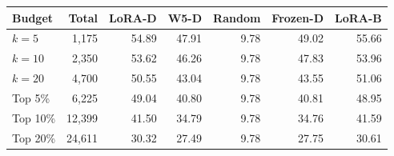 {\footnotesize\setlength{\tabcolsep}{4pt}
\begin{tabularx}{\textwidth}{Xrrrrrr}
\toprule
Budget & Total & LoRA-D & W5-D & Random & Frozen-D & LoRA-B \\
\midrule
$k=5$ & 1,175 & 54.89 & 47.91 & 9.78 & 49.02 & 55.66 \\
$k=10$ & 2,350 & 53.62 & 46.26 & 9.78 & 47.83 & 53.96 \\
$k=20$ & 4,700 & 50.55 & 43.04 & 9.78 & 43.55 & 51.06 \\
Top 5\% & 6,225 & 49.04 & 40.80 & 9.78 & 40.81 & 48.95 \\
Top 10\% & 12,399 & 41.50 & 34.79 & 9.78 & 34.76 & 41.59 \\
Top 20\% & 24,611 & 30.32 & 27.49 & 9.78 & 27.75 & 30.61 \\
\bottomrule
\end{tabularx}}
